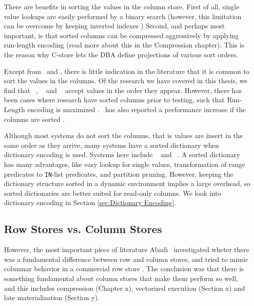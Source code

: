 There are  benefits in sorting the values in the column store. First of all, single value lookups are easily performed by a binary search (however, this limitation can be overcome by keeping inverted indexes \cite{Lemke2010-is, Schwalb2014-hn}) Second, and perhaps most important, is that sorted columns can be compressed aggressively by applying run-length encoding (read more about this in the Compression chapter). This is the reason why C-store \cite{Stonebraker2005-qz} lets the DBA define projections of various sort orders.

Except from \cstore~and \vertica, there is little indication in the literature that it is common to sort the values in the columns. Of the research we have covered in this thesis, we find that \mssql~\cite{Larson2013-mc}, \blink~\cite{Raman2013-em} and \oracle~\cite{Lahiri2015-mz} accept values in the order they appear. However, there has been cases where research have sorted columns prior to testing, such that Run-Length encoding is maximized \cite{Holloway2008-rr}. \blink~has also reported a performance increase if the columns are sorted \cite{Johnson2008-cp}.

Although most systems do not sort the columns, that is values are insert in the same order as they arrive, many systems have a sorted dictionary when dictionary encoding is used. Systems here include \blink~\cite{Johnson2008-cp} and \saph~\cite{Farber2012-vh}. A sorted dictionary has many advantages, like easy lookup for single values, transformation of range predicates to \texttt{IN}-list predicates, and partition pruning. However, keeping the dictionary structure sorted in a dynamic environment implies a large overhead, so sorted dictionaries are better suited for read-only columns. We look into dictionary encoding in Section \ref{sec:Dictionary Encoding}.

\subsection{Row Stores vs. Column Stores}
\label{sub:Row Stores vs. Column Stores}
However, the most important piece of literature Abadi \ea~investigated wheter there was a fundamental difference between row and column stores, and tried to mimic columnar behavior in a commercial row store \cite{Abadi2008-dd} . The conclusion was that there is something fundamental about column stores that make them perform so well, and this includes compression (Chapter x), vectorized execution (Section x) and late materialization (Section y). 

